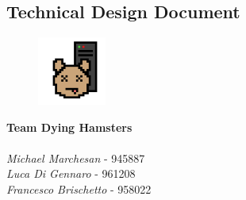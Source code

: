\begin{titlepage}

\section*{Technical Design Document}


\begin{figure}
	\centering
	\includegraphics[max width=0.2\textwidth]{../Pictures/DH_logo.png}
\end{figure}

\textbf{Team Dying Hamsters} \\ \\
\textit{Michael Marchesan} - 945887 \\
\textit{Luca Di Gennaro} - 961208 \\
\textit{Francesco Brischetto} - 958022 

\end{titlepage}

